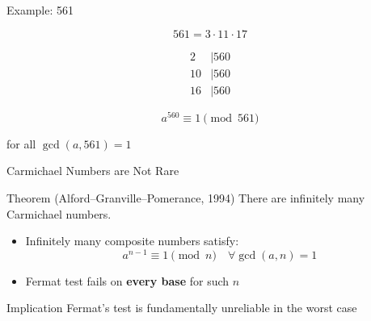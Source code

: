 \documentclass{beamer}
\newcommand{\bld}[1]{\textbf{#1}}
\begin{document}
\begin{frame}{Example: 561}

\[
561 = 3 \cdot 11 \cdot 17
\]

\[
\begin{aligned}
2 &\mid 560 \\
10 &\mid 560 \\
16 &\mid 560
\end{aligned}
\]

\vspace{1em}

\[
a^{560} \equiv 1 \pmod{561}
\]

for all $\gcd(a,561)=1$

\end{frame}


\begin{frame}{Carmichael Numbers are Not Rare}

\begin{block}{Theorem (Alford--Granville--Pomerance, 1994)}
There are infinitely many Carmichael numbers.
\end{block}

\vspace{1em}

\begin{itemize}
    \item Infinitely many composite numbers satisfy:
    \[
    a^{n-1} \equiv 1 \pmod{n} \quad \forall \gcd(a,n)=1
    \]
    \item Fermat test fails on \bld{every base} for such $n$
\end{itemize}

\vspace{1em}

\begin{block}{Implication}
Fermat's test is fundamentally unreliable in the worst case
\end{block}

\end{frame}

\end{document}
